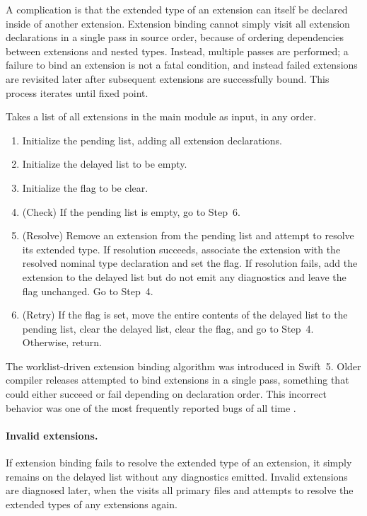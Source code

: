 \documentclass[../generics]{subfiles}
\begin{document}
A complication is that the extended type of an extension can itself be declared inside of another extension. Extension binding cannot simply visit all extension declarations in a single pass in source order, because of ordering dependencies between extensions and nested types. Instead, multiple passes are performed; a failure to bind an extension is not a fatal condition, and instead failed extensions are revisited later after subsequent extensions are successfully bound. This process iterates until fixed point.
\begin{algorithm}\label{extension binding algorithm}
Takes a list of all extensions in the main module as input, in any order.
\begin{enumerate}
\item Initialize the pending list, adding all extension declarations.
\item Initialize the delayed list to be empty.
\item Initialize the flag to be clear.
\item (Check) If the pending list is empty, go to Step~6.
\item (Resolve) Remove an extension from the pending list and attempt to resolve its extended type. If resolution succeeds, associate the extension with the resolved nominal type declaration and set the flag. If resolution fails, add the extension to the delayed list but do not emit any diagnostics and leave the flag unchanged. Go to Step~4.
\item (Retry) If the flag is set, move the entire contents of the delayed list to the pending list, clear the delayed list, clear the flag, and go to Step~4. Otherwise, return.
\end{enumerate}
\end{algorithm}
The worklist-driven extension binding algorithm was introduced in Swift~5. Older compiler releases attempted to bind extensions in a single pass, something that could either succeed or fail depending on declaration order. This incorrect behavior was one of the most frequently reported bugs of all time \cite{sr631}.

\paragraph{Invalid extensions.} If extension binding fails to resolve the extended type of an extension, it simply remains on the delayed list without any diagnostics emitted. Invalid extensions are diagnosed later, when the  visits all primary files and attempts to resolve the extended types of any extensions again.
\end{document}
